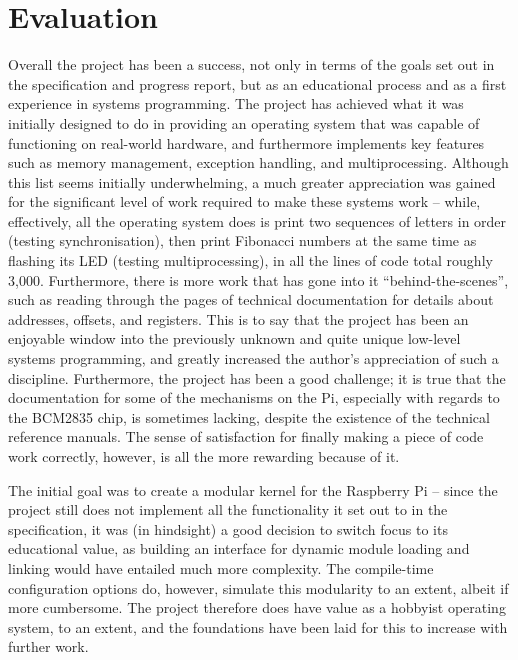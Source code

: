\section{Evaluation}
    \label{sec:evaluation}
    Overall the project has been a success, not only in terms of the goals set
    out in the specification and progress report, but as an educational
    process and as a first experience in systems programming. The project has
    achieved what it was initially designed to do in providing an operating
    system that was capable of functioning on real-world hardware, and
    furthermore implements key features such as memory management, exception
    handling, and multiprocessing. Although this list seems initially
    underwhelming, a much greater appreciation was gained for the significant
    level of work required to make these systems work -- while, effectively, all
    the operating system does is print two sequences of letters in order
    (testing synchronisation), then print Fibonacci numbers at the same time as
    flashing its LED (testing multiprocessing), in all the lines of code total
    roughly 3,000. Furthermore, there is more work that has gone into it
    ``behind-the-scenes'', such as reading through the pages of technical
    documentation for details about addresses, offsets, and registers. This is
    to say that the project has been an enjoyable window into the previously
    unknown and quite unique low-level systems programming, and greatly
    increased the author's appreciation of such a discipline. Furthermore, the
    project has been a good challenge; it is true that the documentation for
    some of the mechanisms on the Pi, especially with regards to the BCM2835
    chip, is sometimes lacking, despite the existence of the technical reference
    manuals. The sense of satisfaction for finally making a piece of code work
    correctly, however, is all the more rewarding because of it.

    The initial goal was to create a modular kernel for the Raspberry Pi --
    since the project still does not implement all the functionality it set out
    to in the specification, it was (in hindsight) a good decision to switch
    focus to its educational value, as building an interface for dynamic module
    loading and linking would have entailed much more complexity. The
    compile-time configuration options do, however, simulate this modularity to
    an extent, albeit if more cumbersome. The project therefore does have value
    as a hobbyist operating system, to an extent, and the foundations have been
    laid for this to increase with further work.

